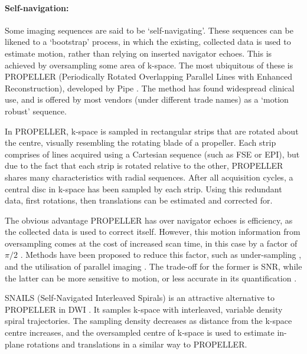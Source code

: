\documentclass[class=article, crop=false]{standalone}
\begin{document}
\paragraph{Self-navigation:}
Some imaging sequences are said to be `self-navigating'. These sequences can be likened to a `bootstrap' process, in which the existing, collected data is used to estimate motion, rather than relying on inserted navigator echoes. This is achieved by oversampling some area of k-space. The most ubiquitous of these is PROPELLER (Periodically Rotated Overlapping Parallel Lines with Enhanced Reconstruction), developed by Pipe \parencite*{Pipe1999}. The method has found widespread clinical use, and is offered by most vendors (under different trade names) as a `motion robust' sequence.
\par
In PROPELLER, k-space is sampled in rectangular strips that are rotated about the centre, visually resembling the rotating blade of a propeller. Each strip comprises of lines acquired using a Cartesian sequence (such as FSE or EPI), but due to the fact that each strip is rotated relative to the other, PROPELLER shares many characteristics with radial sequences. After all acquisition cycles, a central disc in k-space has been sampled by each strip. Using this redundant data, first rotations, then translations can be estimated and corrected for.
\par
The obvious advantage PROPELLER has over navigator echoes is efficiency, as the collected data is used to correct itself. However, this motion information from oversampling comes at the cost of increased scan time, in this case by a factor of $\pi/2$ \parencite{Pipe1999}. Methods have been proposed to reduce this factor, such as under-sampling \parencite{Arfanakis2005,Tamhane2012}, and the utilisation of parallel imaging \parencite{Li2011,Skare2008,Chuang2006}. The trade-off for the former is SNR, while the latter can be more sensitive to motion, or less accurate in its quantification \parencite{Tamhane2012}.
\par
SNAILS (Self-Navigated Interleaved Spirals) is an attractive alternative to PROPELLER in DWI \parencite{Liu2004,Liu2005}. It samples k-space with interleaved, variable density spiral trajectories. The sampling density decreases as distance from the k-space centre increases, and the oversampled centre of k-space is used to estimate in-plane rotations and translations in a similar way to PROPELLER.
\par 
\end{document}
